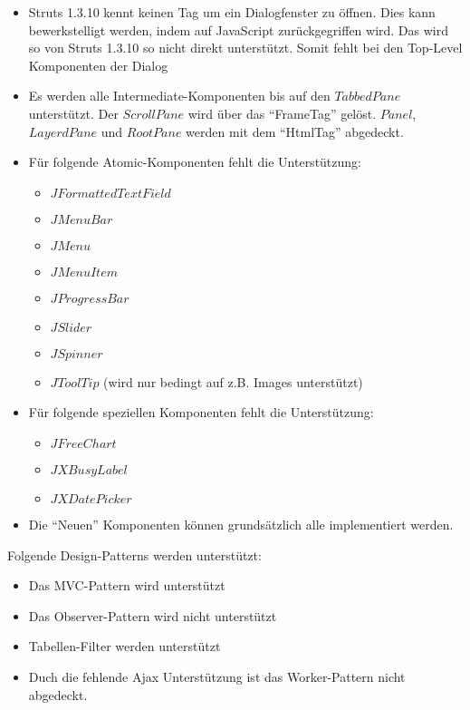 \begin{itemize}
  \item Struts 1.3.10 kennt keinen Tag um ein Dialogfenster zu öffnen. Dies kann
  bewerkstelligt werden, indem auf JavaScript zurückgegriffen wird. Das wird so
  von Struts 1.3.10 so nicht direkt unterstützt. Somit fehlt bei den Top-Level
  Komponenten der Dialog
  \item Es werden alle Intermediate-Komponenten bis auf den
  \(TabbedPane\) unterstützt. Der \(ScrollPane\) wird über das ``FrameTag''
  gelöst. \(Panel\), \(LayerdPane\) und \(RootPane\) werden mit dem ``HtmlTag''
  abgedeckt.
  \item Für folgende Atomic-Komponenten fehlt die Unterstützung:
  \begin{itemize}
    \item \(JFormattedTextField\)
    \item \(JMenuBar\)
    \item \(JMenu\)
    \item \(JMenuItem\)
    \item \(JProgressBar\)
    \item \(JSlider\)
    \item \(JSpinner\)
    \item \(JToolTip\) (wird nur bedingt auf z.B. Images unterstützt)
  \end{itemize}
  \item Für folgende speziellen Komponenten fehlt die Unterstützung:
  \begin{itemize}
    \item \(JFreeChart\)
    \item \(JXBusyLabel\)
    \item \(JXDatePicker\)
  \end{itemize}
  \item Die ``Neuen'' Komponenten können grundsätzlich alle implementiert
  werden.
\end{itemize}

Folgende Design-Patterns werden unterstützt:

\begin{itemize}
  \item Das MVC-Pattern wird unterstützt
  \item Das Observer-Pattern wird nicht unterstützt
  \item Tabellen-Filter werden unterstützt
  \item Duch die fehlende \ac{Ajax} Unterstützung ist das
  Worker-Pattern nicht abgedeckt.
\end{itemize}

